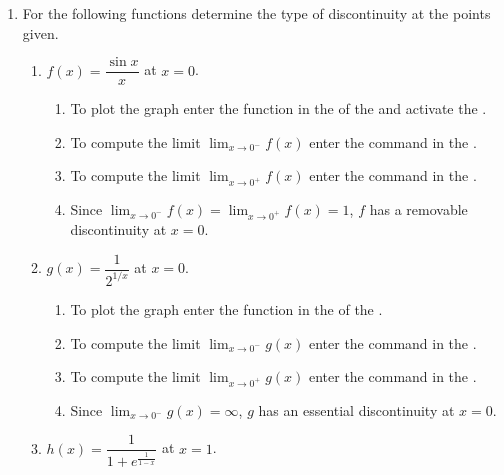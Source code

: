 \begin{enumerate}[leftmargin=*]
\item For the following functions determine the type of discontinuity at the points given.
      \begin{enumerate}
      \item  $f(x)=\dfrac{\sin x}{x}$ at $x=0$.

            \begin{indication}
            \begin{enumerate}
            \item To plot the graph enter the function  in the  of the  and activate the .
            \item To compute the limit $\lim_{x\rightarrow 0^-}f(x)$ enter the command  in the .
            \item To compute the limit $\lim_{x\rightarrow 0^+}f(x)$ enter the command  in the .
            \item Since $\lim_{x\rightarrow 0^-}f(x)=\lim_{x\rightarrow 0^+}f(x)=1$, $f$ has a removable discontinuity at $x=0$.
            \end{enumerate}
            \end{indication}
      \item $g(x)=\dfrac{1}{2^{1/x}}$ at $x=0$.
            \begin{indication}
            \begin{enumerate}
            \item To plot the graph  enter the function  in the  of the .
            \item To compute the limit $\lim_{x\rightarrow 0^-}g(x)$ enter the command  in the .
            \item To compute the limit $\lim_{x\rightarrow 0^+}g(x)$ enter the command  in the .
            \item Since $\lim_{x\rightarrow 0^-}g(x)=\infty$, $g$ has an essential discontinuity at $x=0$.
            \end{enumerate}
            \end{indication}
      \item $h(x)=\dfrac{1}{1+e^{\frac{1}{1-x}}}$ at $x=1$.
            \begin{indication}
            \begin{enumerate}

\end{enumerate}
\end{indication}
\end{enumerate}
\end{enumerate}
